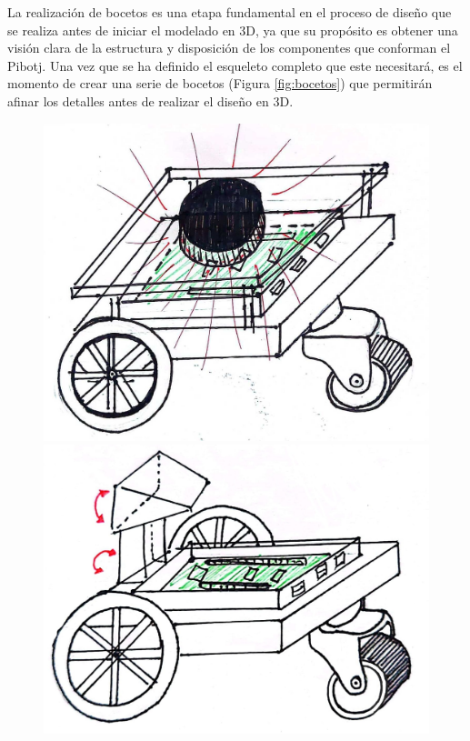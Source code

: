 La realización de bocetos es una etapa fundamental en el proceso de diseño que se realiza antes de iniciar el modelado en 3D, ya que su propósito es obtener una visión clara de la estructura y disposición de los componentes que conforman el Pibotj. Una vez que se ha definido el esqueleto completo que este necesitará, es el momento de crear una serie de bocetos (Figura \ref{fig:bocetos}) que permitirán afinar los detalles antes de realizar el diseño en 3D.

\begin{figure}[ht!]
	\centering
	\begin{minipage}{0.4\linewidth}
		\centering
		\includegraphics[width=\linewidth]{figs/cap5/prototipo_laser.jpeg}
	\end{minipage}
	\hspace{2cm}
	\begin{minipage}{0.4\linewidth}
		\centering
		\includegraphics[width=\linewidth]{figs/cap5/prototipo_sin_laser.jpeg}

\end{minipage}
\end{figure}
